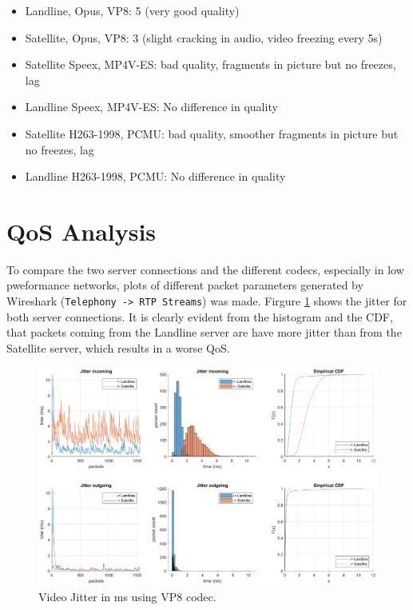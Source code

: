 \documentclass[parskip=full]{scrartcl}
\begin{document}
\begin{itemize}
	\item Landline, Opus, VP8: 5 (very good quality)
	\item Satellite, Opus, VP8: 3 (slight cracking in audio, video freezing every 5s)
	\item Satellite Speex, MP4V-ES: bad quality, fragments in picture but no freezes, lag
	\item Landline Speex, MP4V-ES: No difference in quality
	\item Satellite H263-1998, PCMU: bad quality, smoother fragments in picture but no freezes, lag
	\item Landline H263-1998, PCMU: No difference in quality
\end{itemize}

\section{QoS Analysis}
To compare the two server connections and the different codecs, especially in low pweformance networks, plots of different packet parameters generated by Wireshark (\texttt{Telephony -> RTP Streams}) was made. 
Firgure \ref{fig:vp8_jitter} shows the jitter for both server connections. 
It is clearly evident from the histogram and the CDF, that packets coming from the Landline server are have more jitter than from the Satellite server, which results in a worse QoS.

\begin{figure}
    \centering
    \includegraphics[width=1\textwidth]{results/Video_VP8_Jitter.eps} 
    \caption{Video Jitter in ms using VP8 codec. }
    \label{fig:vp8_jitter}
\end{figure}
\end{document}
